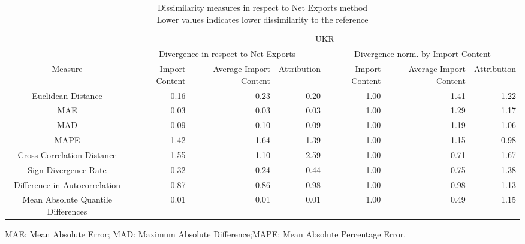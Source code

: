 \begin{table}[t]
\caption*{
{\large Dissimilarity measures in respect to Net Exports method} \\ 
{\small Lower values indicates lower dissimilarity to the reference}
} 
\fontsize{15.0pt}{18.0pt}\selectfont
\begin{tabular*}{\linewidth}{@{\extracolsep{\fill}}crrrrrr}
\toprule
 & \multicolumn{6}{c}{UKR} \\ 
\cmidrule(lr){2-7}
 & \multicolumn{3}{c}{Divergence in respect to Net Exports} & \multicolumn{3}{c}{Divergence norm. by Import Content} \\ 
\cmidrule(lr){2-4} \cmidrule(lr){5-7}
Measure & Import Content & Average Import Content & Attribution & Import Content & Average Import Content & Attribution \\ 
\midrule\addlinespace[2.5pt]
Euclidean Distance & 0.16 & 0.23 & 0.20 & 1.00 & 1.41 & 1.22 \\ 
MAE & 0.03 & 0.03 & 0.03 & 1.00 & 1.29 & 1.17 \\ 
MAD & 0.09 & 0.10 & 0.09 & 1.00 & 1.19 & 1.06 \\ 
MAPE & 1.42 & 1.64 & 1.39 & 1.00 & 1.15 & 0.98 \\ 
Cross-Correlation Distance & 1.55 & 1.10 & 2.59 & 1.00 & 0.71 & 1.67 \\ 
Sign Divergence Rate & 0.32 & 0.24 & 0.44 & 1.00 & 0.75 & 1.38 \\ 
Difference in Autocorrelation & 0.87 & 0.86 & 0.98 & 1.00 & 0.98 & 1.13 \\ 
Mean Absolute Quantile Differences & 0.01 & 0.01 & 0.01 & 1.00 & 0.49 & 1.15 \\ 
\bottomrule
\end{tabular*}
\begin{minipage}{\linewidth}
MAE: Mean Absolute Error; MAD: Maximum Absolute Difference;MAPE: Mean Absolute Percentage Error.\\
\end{minipage}
\end{table}

